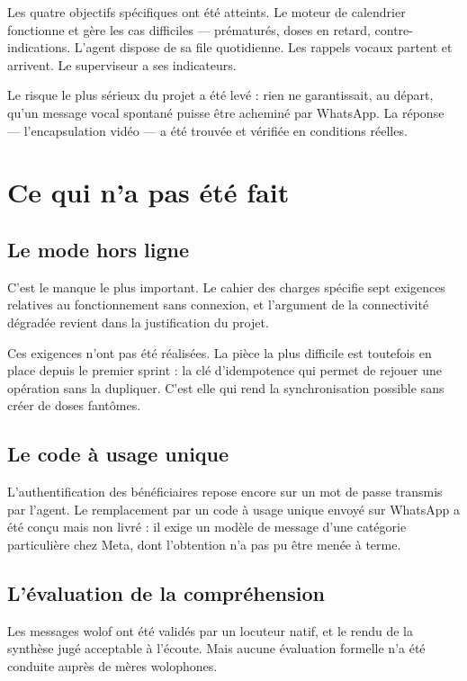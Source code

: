 \documentclass[11pt,a4paper]{report}
\begin{document}
Les quatre objectifs spécifiques ont été atteints. Le moteur de calendrier
fonctionne et gère les cas difficiles — prématurés, doses en retard,
contre-indications. L'agent dispose de sa file quotidienne. Les rappels
vocaux partent et arrivent. Le superviseur a ses indicateurs.

Le risque le plus sérieux du projet a été levé : rien ne garantissait, au
départ, qu'un message vocal spontané puisse être acheminé par WhatsApp. La
réponse — l'encapsulation vidéo — a été trouvée et vérifiée en conditions
réelles.

\section{Ce qui n'a pas été fait}

\subsection{Le mode hors ligne}

C'est le manque le plus important. Le cahier des charges spécifie sept
exigences relatives au fonctionnement sans connexion, et l'argument de la
connectivité dégradée revient dans la justification du projet.

Ces exigences n'ont pas été réalisées. La pièce la plus difficile est
toutefois en place depuis le premier sprint : la clé d'idempotence qui permet
de rejouer une opération sans la dupliquer. C'est elle qui rend la
synchronisation possible sans créer de doses fantômes.

\subsection{Le code à usage unique}

L'authentification des bénéficiaires repose encore sur un mot de passe
transmis par l'agent. Le remplacement par un code à usage unique envoyé sur
WhatsApp a été conçu mais non livré : il exige un modèle de message d'une
catégorie particulière chez Meta, dont l'obtention n'a pas pu être menée à
terme.

\subsection{L'évaluation de la compréhension}

Les messages wolof ont été validés par un locuteur natif, et le rendu de la
synthèse jugé acceptable à l'écoute. Mais aucune évaluation formelle n'a été
conduite auprès de mères wolophones.
\end{document}
